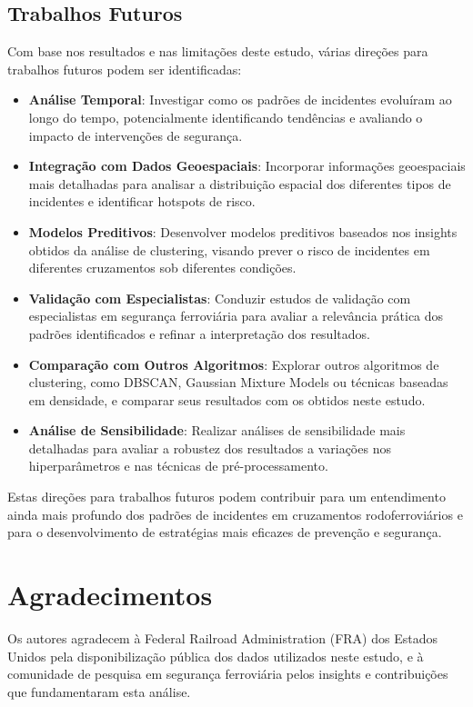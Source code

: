 \documentclass[conference]{IEEEtran}
\begin{document}
\subsection{Trabalhos Futuros}
Com base nos resultados e nas limitações deste estudo, várias direções para trabalhos futuros podem ser identificadas:

\begin{itemize}
    \item \textbf{Análise Temporal}: Investigar como os padrões de incidentes evoluíram ao longo do tempo, potencialmente identificando tendências e avaliando o impacto de intervenções de segurança.
    
    \item \textbf{Integração com Dados Geoespaciais}: Incorporar informações geoespaciais mais detalhadas para analisar a distribuição espacial dos diferentes tipos de incidentes e identificar hotspots de risco.
    
    \item \textbf{Modelos Preditivos}: Desenvolver modelos preditivos baseados nos insights obtidos da análise de clustering, visando prever o risco de incidentes em diferentes cruzamentos sob diferentes condições.
    
    \item \textbf{Validação com Especialistas}: Conduzir estudos de validação com especialistas em segurança ferroviária para avaliar a relevância prática dos padrões identificados e refinar a interpretação dos resultados.
    
    \item \textbf{Comparação com Outros Algoritmos}: Explorar outros algoritmos de clustering, como DBSCAN, Gaussian Mixture Models ou técnicas baseadas em densidade, e comparar seus resultados com os obtidos neste estudo.
    
    \item \textbf{Análise de Sensibilidade}: Realizar análises de sensibilidade mais detalhadas para avaliar a robustez dos resultados a variações nos hiperparâmetros e nas técnicas de pré-processamento.
\end{itemize}

Estas direções para trabalhos futuros podem contribuir para um entendimento ainda mais profundo dos padrões de incidentes em cruzamentos rodoferroviários e para o desenvolvimento de estratégias mais eficazes de prevenção e segurança.

\section*{Agradecimentos}
Os autores agradecem à Federal Railroad Administration (FRA) dos Estados Unidos pela disponibilização pública dos dados utilizados neste estudo, e à comunidade de pesquisa em segurança ferroviária pelos insights e contribuições que fundamentaram esta análise.
\end{document}
